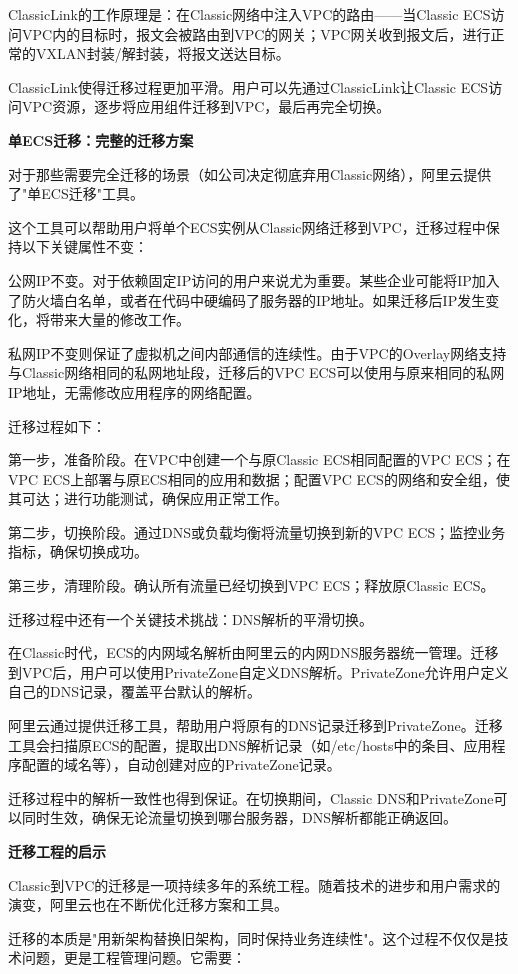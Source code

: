 ClassicLink的工作原理是：在Classic网络中注入VPC的路由——当Classic ECS访问VPC内的目标时，报文会被路由到VPC的网关；VPC网关收到报文后，进行正常的VXLAN封装/解封装，将报文送达目标。

ClassicLink使得迁移过程更加平滑。用户可以先通过ClassicLink让Classic ECS访问VPC资源，逐步将应用组件迁移到VPC，最后再完全切换。

\textbf{单ECS迁移：完整的迁移方案}

对于那些需要完全迁移的场景（如公司决定彻底弃用Classic网络），阿里云提供了"单ECS迁移"工具。

这个工具可以帮助用户将单个ECS实例从Classic网络迁移到VPC，迁移过程中保持以下关键属性不变：

公网IP不变。对于依赖固定IP访问的用户来说尤为重要。某些企业可能将IP加入了防火墙白名单，或者在代码中硬编码了服务器的IP地址。如果迁移后IP发生变化，将带来大量的修改工作。

私网IP不变则保证了虚拟机之间内部通信的连续性。由于VPC的Overlay网络支持与Classic网络相同的私网地址段，迁移后的VPC ECS可以使用与原来相同的私网IP地址，无需修改应用程序的网络配置。

迁移过程如下：

第一步，准备阶段。在VPC中创建一个与原Classic ECS相同配置的VPC ECS；在VPC ECS上部署与原ECS相同的应用和数据；配置VPC ECS的网络和安全组，使其可达；进行功能测试，确保应用正常工作。

第二步，切换阶段。通过DNS或负载均衡将流量切换到新的VPC ECS；监控业务指标，确保切换成功。

第三步，清理阶段。确认所有流量已经切换到VPC ECS；释放原Classic ECS。

迁移过程中还有一个关键技术挑战：DNS解析的平滑切换。

在Classic时代，ECS的内网域名解析由阿里云的内网DNS服务器统一管理。迁移到VPC后，用户可以使用PrivateZone自定义DNS解析。PrivateZone允许用户定义自己的DNS记录，覆盖平台默认的解析。

阿里云通过提供迁移工具，帮助用户将原有的DNS记录迁移到PrivateZone。迁移工具会扫描原ECS的配置，提取出DNS解析记录（如/etc/hosts中的条目、应用程序配置的域名等），自动创建对应的PrivateZone记录。

迁移过程中的解析一致性也得到保证。在切换期间，Classic DNS和PrivateZone可以同时生效，确保无论流量切换到哪台服务器，DNS解析都能正确返回。

\textbf{迁移工程的启示}

Classic到VPC的迁移是一项持续多年的系统工程。随着技术的进步和用户需求的演变，阿里云也在不断优化迁移方案和工具。

迁移的本质是"用新架构替换旧架构，同时保持业务连续性"。这个过程不仅仅是技术问题，更是工程管理问题。它需要：

